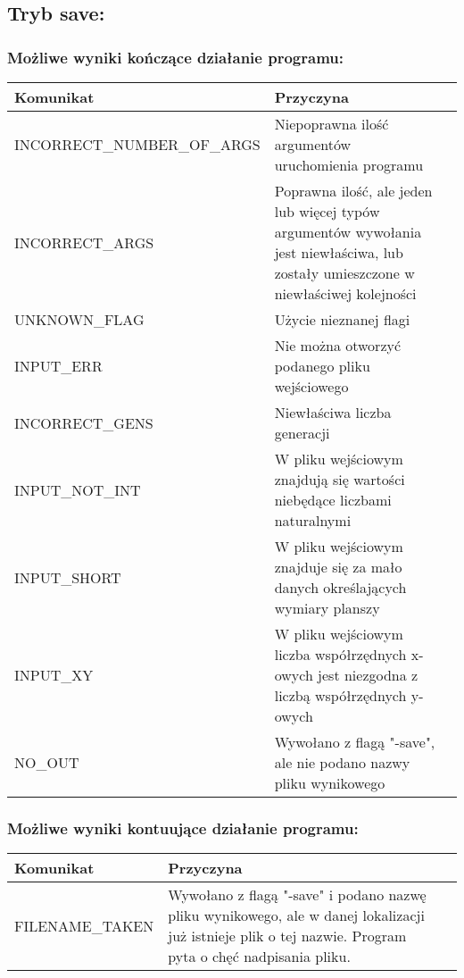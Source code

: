 \documentclass[11pt,a4paper]{report}
\begin{document}
\subsection[Tryb save] {Tryb save:}

\subsubsection {Możliwe wyniki kończące działanie programu:}
\begin{tabularx}{\textwidth}{  X|Xl  }
 \hline
 Komunikat                                   					& Przyczyna\\
 \hline \hline
			INCORRECT\_NUMBER\_OF\_ARGS	&Niepoprawna ilość argumentów uruchomienia programu\\
 \hline
			INCORRECT\_ARGS			&Poprawna ilość, ale jeden lub więcej typów argumentów wywołania jest niewłaściwa, lub zostały umieszczone w niewłaściwej kolejności\\
 \hline
			UNKNOWN\_FLAG	 			&Użycie nieznanej flagi\\
 \hline
			INPUT\_ERR					&Nie można otworzyć podanego pliku wejściowego\\
 \hline
			INCORRECT\_GENS				&Niewłaściwa liczba generacji\\
 \hline
			INPUT\_NOT\_INT			&W pliku wejściowym znajdują się wartości niebędące liczbami naturalnymi\\
 \hline
			INPUT\_SHORT				&W pliku wejściowym znajduje się za mało danych określających wymiary planszy\\
 \hline
			INPUT\_XY					&W pliku wejściowym liczba współrzędnych x-owych jest niezgodna z liczbą współrzędnych y-owych\\
 \hline
			NO\_OUT					&Wywołano z flagą "-save", ale nie podano nazwy pliku wynikowego\\
 \hline
\end{tabularx}

\subsubsection{Możliwe wyniki kontuujące działanie programu:}
\begin{tabularx}{\textwidth}{  X|Xl  }
\hline
Komunikat                                    					& Przyczyna\\
\hline \hline

			FILENAME\_TAKEN				&Wywołano z flagą "-save" i podano nazwę pliku wynikowego, ale w danej lokalizacji już istnieje plik o tej nazwie. Program pyta o chęć nadpisania pliku.\\
\hline
\end{tabularx}
\end{document}
